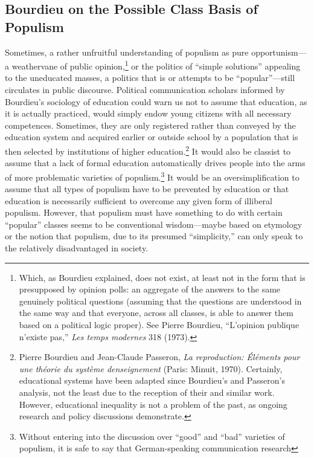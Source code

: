 \documentclass{tufte-handout}
\begin{document}
\hypertarget{bourdieu-on-the-possible-class-basis-of-populism}{%
\subsection{Bourdieu on the Possible Class
Basis of
Populism}\label{bourdieu-on-the-possible-class-basis-of-populism}}

Sometimes, a rather unfruitful understanding of populism as pure
opportunism---a weathervane of public opinion,\footnote{Which, as
  Bourdieu explained, does not exist, at least not in the form that is
  presupposed by opinion polls: an aggregate of the answers to the same
  genuinely political questions (assuming that the questions are
  understood in the same way and that everyone, across all classes, is
  able to answer them based on a political logic proper). See Pierre
  Bourdieu, ``L'opinion publique n'existe pas,'' \emph{Les temps
  modernes} 318 (1973).} or the politics of ``simple solutions''
appealing to the uneducated masses, a politics that is or attempts to be
``popular''---still circulates in public discourse. Political
communication scholars informed by Bourdieu's sociology of education
could warn us not to assume that education, as it is actually practiced,
would simply endow young citizens with all necessary competences.
Sometimes, they are only registered rather than conveyed by the
education system and acquired earlier or outside school by a population
that is then selected by institutions of higher education.\footnote{Pierre
  Bourdieu and Jean-Claude Passeron, \emph{La reproduction: Éléments
  pour une théorie du système d\textquotesingle enseignement} (Paris:
  Minuit, 1970). Certainly, educational systems have been adapted since
  Bourdieu's and Passeron's analysis, not the least due to the reception
  of their and similar work. However, educational inequality is not a
  problem of the past, as ongoing research and policy discussions
  demonstrate.} It would also be classist to assume that a lack of
formal education automatically drives people into the arms of more
problematic varieties of populism.\footnote{Without entering into the
  discussion over ``good'' and ``bad'' varieties of populism, it is safe
  to say that German-speaking communication research} It would be an oversimplification to assume
that all types of populism have to be prevented by education or that
education is necessarily sufficient to overcome any given form of
illiberal populism. However, that populism must have something to do
with certain ``popular'' classes seems to be conventional wisdom---maybe
based on etymology or the notion that populism, due to its presumed
``simplicity,'' can only speak to the relatively disadvantaged in
society.
\end{document}
